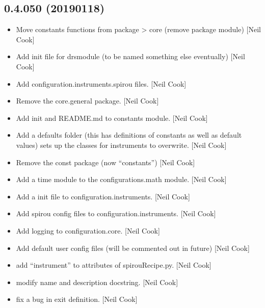 \documentclass[a4paper,10pt,english]{report}
\begin{document}
\subsection{0.4.050 (2019\sphinxhyphen{}01\sphinxhyphen{}18)}
\label{\detokenize{misc/changelog:id233}}\begin{itemize}
\item {} 
Move constants functions from package \textendash{}\textgreater{} core (remove package module)
{[}Neil Cook{]}

\item {} 
Add init file for drsmodule (to be named something else eventually)
{[}Neil Cook{]}

\item {} 
Add configuration.instruments.spirou files. {[}Neil Cook{]}

\item {} 
Remove the core.general package. {[}Neil Cook{]}

\item {} 
Add init and README.md to constants module. {[}Neil Cook{]}

\item {} 
Add a defaults folder (this has definitions of constants as well as
default values) \sphinxhyphen{} sets up the classes for instruments to overwrite.
{[}Neil Cook{]}

\item {} 
Remove the const package (now “constants”) {[}Neil Cook{]}

\item {} 
Add a time module to the configurations.math module. {[}Neil Cook{]}

\item {} 
Add a init file to configuration.instruments. {[}Neil Cook{]}

\item {} 
Add spirou config files to configuration.instruments. {[}Neil Cook{]}

\item {} 
Add logging to configuration.core. {[}Neil Cook{]}

\item {} 
Add default user config files (will be commented out in future) {[}Neil
Cook{]}

\item {} 
 \sphinxhyphen{} add “instrument” to attributes of spirouRecipe.py.
{[}Neil Cook{]}

\item {} 
 \sphinxhyphen{} modify name and description docstring. {[}Neil Cook{]}

\item {} 
 \sphinxhyphen{} fix a bug in exit definition. {[}Neil Cook{]}

\end{itemize}
\end{document}
